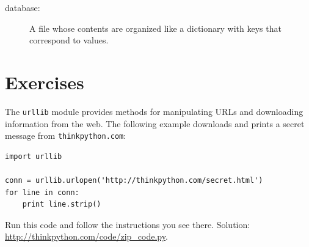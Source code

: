 \documentclass[10pt]{book}
\begin{document}
\begin{CJK}{UTF8}{gbsn}
\begin{description}
\item[database:] A file whose contents are organized like a dictionary
with keys that correspond to values.

\end{description}


\section{Exercises}

\begin{exercise}
\label{urllib}

The {\tt urllib} module provides methods for manipulating URLs
and downloading information from the web.  The following example
downloads and prints a secret message from {\tt thinkpython.com}:

\begin{verbatim}
import urllib

conn = urllib.urlopen('http://thinkpython.com/secret.html')
for line in conn:
    print line.strip()
\end{verbatim}

Run this code and follow the instructions you see there.
Solution: \url{http://thinkpython.com/code/zip_code.py}.

\end{exercise}





%


\end{CJK}
\end{document}
